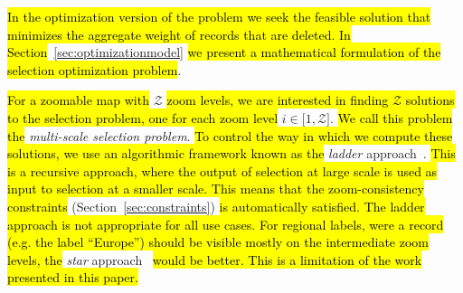 \hl{In the optimization version of the problem we seek the feasible solution that minimizes the aggregate weight of records that are deleted. In Section}~\ref{sec:optimizationmodel}\hl{ we present a mathematical formulation of the selection optimization problem}.

\hl{For a zoomable map with }$\mathcal{Z}$\hl{ zoom levels, we are interested in finding $\mathcal{Z}$ solutions to the selection problem, one for each zoom level }$i \in \lbrack 1, \mathcal{Z} \rbrack$. \hl{We call this problem the }\emph{multi-scale selection problem}. \hl{To control the way in which we compute these solutions, we use an algorithmic framework known as the }\emph{ladder} approach~\cite{foerster2010challenges}. \hl{This is a recursive approach, where the output of selection at large scale is used as input to selection at a smaller scale. This means that the zoom-consistency constraints }(Section~\ref{sec:constraints})\hl{ is automatically satisfied. The ladder approach is not appropriate for all use cases. For regional labels, were a record (e.g. the label ``Europe'') should be visible mostly on the intermediate zoom levels, the }\emph{star} approach~\cite{foerster2010challenges}\hl{ would be better. This is a limitation of the work presented in this paper.}



